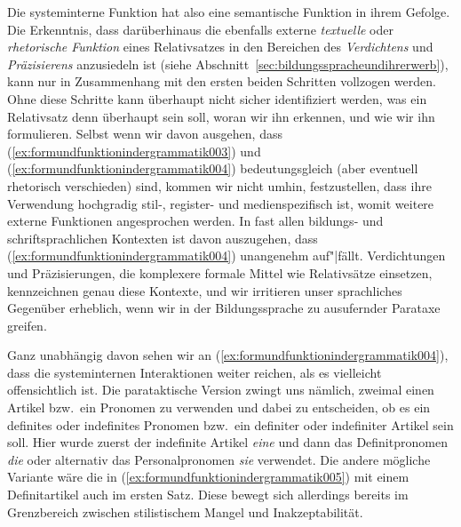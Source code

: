 \begin{exe}
\end{exe}

Die systeminterne Funktion hat also eine semantische Funktion in ihrem Gefolge.
Die Erkenntnis, dass darüberhinaus die ebenfalls externe \textit{textuelle} oder \textit{rhetorische Funktion} eines Relativsatzes in den Bereichen des \textit{Verdichtens} und \textit{Präzisierens} anzusiedeln ist (siehe Abschnitt~\ref{sec:bildungsspracheundihrerwerb}), kann nur in Zusammenhang mit den ersten beiden Schritten vollzogen werden.
Ohne diese Schritte kann überhaupt nicht sicher identifiziert werden, was ein Relativsatz denn überhaupt sein soll, woran wir ihn erkennen, und wie wir ihn formulieren.
Selbst wenn wir davon ausgehen, dass (\ref{ex:formundfunktionindergrammatik003}) und (\ref{ex:formundfunktionindergrammatik004}) bedeutungsgleich (aber eventuell rhetorisch verschieden) sind, kommen wir nicht umhin, festzustellen, dass ihre Verwendung hochgradig stil-, register- und medienspezifisch ist, womit weitere externe Funktionen angesprochen werden.
In fast allen bildungs- und schriftsprachlichen Kontexten ist davon auszugehen, dass (\ref{ex:formundfunktionindergrammatik004}) unangenehm auf"|fällt.
Verdichtungen und Präzisierungen, die komplexere formale Mittel wie Relativsätze einsetzen, kennzeichnen genau diese Kontexte, und wir irritieren unser sprachliches Gegenüber erheblich, wenn wir in der Bildungssprache zu ausufernder Parataxe greifen.

Ganz unabhängig davon sehen wir an (\ref{ex:formundfunktionindergrammatik004}), dass die systeminternen Interaktionen weiter reichen, als es vielleicht offensichtlich ist.
Die parataktische Version zwingt uns nämlich, zweimal einen Artikel bzw.\ ein Pronomen zu verwenden und dabei zu entscheiden, ob es ein definites oder indefinites Pronomen bzw.\ ein definiter oder indefiniter Artikel sein soll.
Hier wurde zuerst der indefinite Artikel \textit{eine} und dann das Definitpronomen \textit{die} oder alternativ das Personalpronomen \textit{sie} verwendet.
Die andere mögliche Variante wäre die in (\ref{ex:formundfunktionindergrammatik005}) mit einem Definitartikel auch im ersten Satz.
Diese bewegt sich allerdings bereits im Grenzbereich zwischen stilistischem Mangel und Inakzeptabilität.

\begin{exe}
\end{exe}

